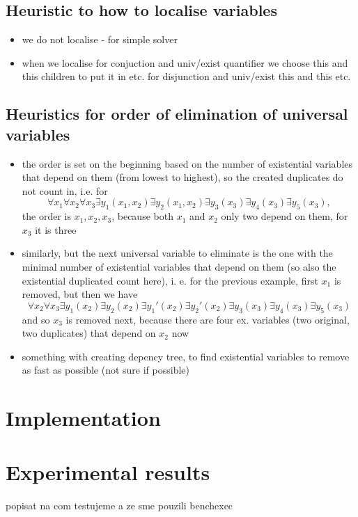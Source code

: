 \documentclass[
  digital, %
  twoside, %
  table,   %
  nolof,     %
  nolot,     %
]{fithesis3}
\theoremstyle{definition}
\theoremstyle{remark}
\begin{document}
\section{Heuristic to how to localise variables}
\begin{itemize}
    \item we do not localise - for simple solver
    \item when we localise for conjuction and univ/exist quantifier we choose this and this children to put it in etc. for disjunction and univ/exist this and this etc.
\end{itemize}

\section{Heuristics for order of elimination of universal variables}
\begin{itemize}
    \item the order is set on the beginning based on the number of existential variables that depend on them (from lowest to highest), so the created duplicates do not count in, i.e. for \[\forall x_1 \forall x_2 \forall x_3 \exists y_1(x_1, x_2) \exists y_2(x_1,x_2) \exists y_3(x_3) \exists y_4(x_3) \exists y_5 (x_3),\] the order is $x_1, x_2, x_3$, because both $x_1$ and $x_2$ only two depend on them, for $x_3$ it is three
    \item similarly, but the next universal variable to eliminate is the one with the minimal number of existential variables that depend on them (so also the existential duplicated count here), i. e. for the previous example, first $x_1$ is removed, but then we have \[\forall x_2 \forall x_3 \exists y_1(x_2) \exists y_2(x_2) \exists y_1'(x_2) \exists y_2'(x_2) \exists y_3(x_3) \exists y_4(x_3) \exists y_5 (x_3)\] and so $x_3$ is removed next, because there are four ex. variables (two original, two duplicates) that depend on $x_2$ now
    \item something with creating depency tree, to find existential variables to remove as fast as possible (not sure if possible)
\end{itemize}

\chapter{Implementation}

\chapter{Experimental results}
popisat na com testujeme a ze sme pouzili benchexec
\end{document}
